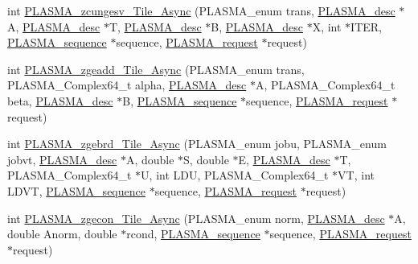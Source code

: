 \begin{DoxyCompactItemize}
\item 
int \hyperlink{group__PLASMA__Complex64__t__Tile__Async_ga968e899d87b6805ffbd6975359e05efd_ga968e899d87b6805ffbd6975359e05efd}{P\+L\+A\+S\+M\+A\+\_\+zcungesv\+\_\+\+Tile\+\_\+\+Async} (P\+L\+A\+S\+M\+A\+\_\+enum trans, \hyperlink{structplasma__desc__t}{P\+L\+A\+S\+M\+A\+\_\+desc} $\ast$A, \hyperlink{structplasma__desc__t}{P\+L\+A\+S\+M\+A\+\_\+desc} $\ast$T, \hyperlink{structplasma__desc__t}{P\+L\+A\+S\+M\+A\+\_\+desc} $\ast$B, \hyperlink{structplasma__desc__t}{P\+L\+A\+S\+M\+A\+\_\+desc} $\ast$X, int $\ast$I\+T\+E\+R, \hyperlink{structplasma__sequence__t}{P\+L\+A\+S\+M\+A\+\_\+sequence} $\ast$sequence, \hyperlink{structplasma__request__t}{P\+L\+A\+S\+M\+A\+\_\+request} $\ast$request)
\item 
int \hyperlink{group__PLASMA__Complex64__t__Tile__Async_ga3c433880bffd3abb77cc4b98bb4c2648_ga3c433880bffd3abb77cc4b98bb4c2648}{P\+L\+A\+S\+M\+A\+\_\+zgeadd\+\_\+\+Tile\+\_\+\+Async} (P\+L\+A\+S\+M\+A\+\_\+enum trans, P\+L\+A\+S\+M\+A\+\_\+\+Complex64\+\_\+t alpha, \hyperlink{structplasma__desc__t}{P\+L\+A\+S\+M\+A\+\_\+desc} $\ast$A, P\+L\+A\+S\+M\+A\+\_\+\+Complex64\+\_\+t beta, \hyperlink{structplasma__desc__t}{P\+L\+A\+S\+M\+A\+\_\+desc} $\ast$B, \hyperlink{structplasma__sequence__t}{P\+L\+A\+S\+M\+A\+\_\+sequence} $\ast$sequence, \hyperlink{structplasma__request__t}{P\+L\+A\+S\+M\+A\+\_\+request} $\ast$request)
\item 
int \hyperlink{group__PLASMA__Complex64__t__Tile__Async_ga606380b6821011a709c6d58740c4acc3_ga606380b6821011a709c6d58740c4acc3}{P\+L\+A\+S\+M\+A\+\_\+zgebrd\+\_\+\+Tile\+\_\+\+Async} (P\+L\+A\+S\+M\+A\+\_\+enum jobu, P\+L\+A\+S\+M\+A\+\_\+enum jobvt, \hyperlink{structplasma__desc__t}{P\+L\+A\+S\+M\+A\+\_\+desc} $\ast$A, double $\ast$S, double $\ast$E, \hyperlink{structplasma__desc__t}{P\+L\+A\+S\+M\+A\+\_\+desc} $\ast$T, P\+L\+A\+S\+M\+A\+\_\+\+Complex64\+\_\+t $\ast$U, int L\+D\+U, P\+L\+A\+S\+M\+A\+\_\+\+Complex64\+\_\+t $\ast$V\+T, int L\+D\+V\+T, \hyperlink{structplasma__sequence__t}{P\+L\+A\+S\+M\+A\+\_\+sequence} $\ast$sequence, \hyperlink{structplasma__request__t}{P\+L\+A\+S\+M\+A\+\_\+request} $\ast$request)
\item 
int \hyperlink{group__PLASMA__Complex64__t__Tile__Async_gab24a1d9c33b2b32a697597c609e1d5cf_gab24a1d9c33b2b32a697597c609e1d5cf}{P\+L\+A\+S\+M\+A\+\_\+zgecon\+\_\+\+Tile\+\_\+\+Async} (P\+L\+A\+S\+M\+A\+\_\+enum norm, \hyperlink{structplasma__desc__t}{P\+L\+A\+S\+M\+A\+\_\+desc} $\ast$A, double Anorm, double $\ast$rcond, \hyperlink{structplasma__sequence__t}{P\+L\+A\+S\+M\+A\+\_\+sequence} $\ast$sequence, \hyperlink{structplasma__request__t}{P\+L\+A\+S\+M\+A\+\_\+request} $\ast$request)

\end{DoxyCompactItemize}
